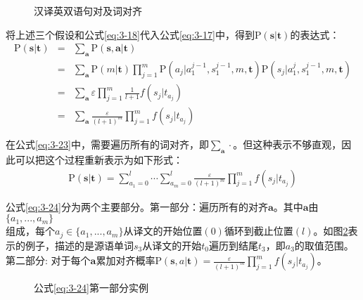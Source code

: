 \begin{figure}[htp]
    \centering

    \caption{汉译英双语句对及词对齐}
    \label{fig:3-18}
\end{figure}

\parinterval 将上述三个假设和公式\ref{eq:3-18}代入公式\ref{eq:3-17}中，得到$\textrm{P}(\mathbf{s}|\mathbf{t})$的表达式：
\begin{eqnarray}
\textrm{P}(\mathbf{s}|\mathbf{t}) & = &  \sum_{\mathbf{a}}{\textrm{P}(\mathbf{s},\mathbf{a}|\mathbf{t})} \nonumber \\
                        & = &  \sum_{\mathbf{a}}{\textrm{P}(m|\mathbf{t})}\prod_{j=1}^{m}{\textrm{P}(a_j|a_1^{j-1},s_1^{j-1},m,\mathbf{t})\textrm{P}(s_j |a_1^j,s_1^{j-1},m,\mathbf{t})} \nonumber \\
                        & = &  \sum_{\mathbf{a}}{\varepsilon}\prod_{j=1}^{m}{\frac{1}{l+1}f(s_j|t_{a_j})} \nonumber \\
                        & = & \sum_{\mathbf{a}}{\frac{\varepsilon}{(l+1)^m}}\prod_{j=1}^{m}f(s_j|t_{a_j})
\label{eq:3-23}
\end{eqnarray}

\parinterval 在公式\ref{eq:3-23}中，需要遍历所有的词对齐，即$ \sum_{\mathbf{a}}{\cdot}$。但这种表示不够直观，因此可以把这个过程重新表示为如下形式：
\begin{eqnarray}
\textrm{P}(\mathbf{s}|\mathbf{t})={\sum_{a_1=0}^{l}\cdots}{\sum_{a_m=0}^{l}\frac{\varepsilon}{(l+1)^m}}{\prod_{j=1}^{m}f(s_j|t_{a_j})}
\label{eq:3-24}
\end{eqnarray}

\parinterval 公式\ref{eq:3-24}分为两个主要部分。第一部分：遍历所有的对齐$\mathbf{a}$。其中$\mathbf{a}$由$\{a_1,...,a_m\}$\\ 组成，每个$a_j\in \{a_1,...,a_m\}$从译文的开始位置$(0)$循环到截止位置$(l)$。如图\ref{fig:3-19}表示的例子，描述的是源语单词$s_3$从译文的开始$t_0$遍历到结尾$t_3$，即$a_3$的取值范围。第二部分: 对于每个$\mathbf{a}$累加对齐概率$\textrm{P}(\mathbf{s},a| \mathbf{t})=\frac{\varepsilon}{(l+1)^m}{\prod_{j=1}^{m}f(s_j|t_{a_j})}$。

\begin{figure}[htp]
    \centering

    \caption{公式{\ref{eq:3-24}}第一部分实例}
    \label{fig:3-19}
\end{figure}

